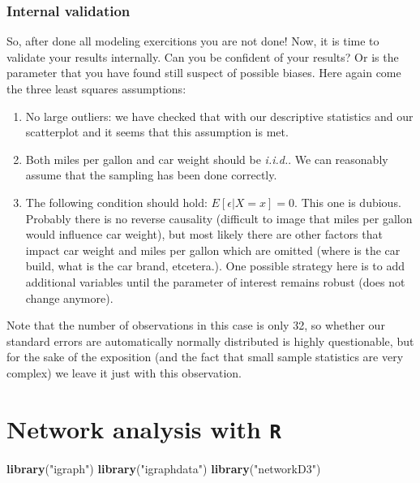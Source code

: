 \documentclass[]{article}
\newenvironment{Shaded}{\begin{snugshade}}{\end{snugshade}}
\newcommand{\KeywordTok}[1]{\textcolor[rgb]{0.13,0.29,0.53}{\textbf{#1}}}
\newcommand{\StringTok}[1]{\textcolor[rgb]{0.31,0.60,0.02}{#1}}
\newcommand{\NormalTok}[1]{#1}
\theoremstyle{definition}
\theoremstyle{definition}
\theoremstyle{definition}
\theoremstyle{remark}
\begin{document}
\subsubsection{Internal validation}\label{internal-validation}

So, after done all modeling exercitions you are not done! Now, it is
time to validate your results internally. Can you be confident of your
results? Or is the parameter that you have found still suspect of
possible biases. Here again come the three least squares assumptions:

\begin{enumerate}
\def\labelenumi{\arabic{enumi}.}
\item
  No large outliers: we have checked that with our descriptive
  statistics and our scatterplot and it seems that this assumption is
  met.
\item
  Both miles per gallon and car weight should be \emph{i.i.d.}. We can
  reasonably assume that the sampling has been done correctly.
\item
  The following condition should hold: \(E[\epsilon|X=x] = 0\). This one
  is dubious. Probably there is no reverse causality (difficult to image
  that miles per gallon would influence car weight), but most likely
  there are other factors that impact car weight and miles per gallon
  which are omitted (where is the car build, what is the car brand,
  etcetera.). One possible strategy here is to add additional variables
  until the parameter of interest remains robust (does not change
  anymore).
\end{enumerate}

Note that the number of observations in this case is only 32, so whether
our standard errors are automatically normally distributed is highly
questionable, but for the sake of the exposition (and the fact that
small sample statistics are very complex) we leave it just with this
observation.

\section{\texorpdfstring{Network analysis with
\texttt{R}}{Network analysis with R}}\label{network-analysis-with-r}

\begin{Shaded}
\begin{Highlighting}[]
\KeywordTok{library}\NormalTok{(}\StringTok{"igraph"}\NormalTok{)}
\KeywordTok{library}\NormalTok{(}\StringTok{"igraphdata"}\NormalTok{)}
\KeywordTok{library}\NormalTok{(}\StringTok{"networkD3"}\NormalTok{)}
\end{Highlighting}
\end{Shaded}
\end{document}
